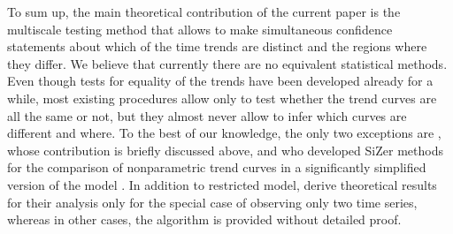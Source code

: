 \documentclass[a4paper,12pt]{article}
\makeatletter
\renewcommand{\eqref}[1]{\tagform@{\ref{#1}}}
\makeatother
\begin{document}


To sum up, the main theoretical contribution of the current paper is the multiscale testing method that allows to make simultaneous confidence statements about which of the time trends are distinct and the regions where they differ. We believe that currently there are no equivalent statistical methods. Even though tests for equality of the trends have been developed already for a while, most existing procedures allow only to test whether the trend curves are all the same or not, but they almost never allow to infer which curves are different and where. To the best of our knowledge, the only two exceptions are \cite{KhismatullinaVogt2021}, whose contribution is briefly discussed above, and \cite{Park2009} who developed SiZer methods for the comparison of nonparametric trend curves in a significantly simplified version of the model \eqref{eq:model}. In addition to restricted model, \cite{Park2009} derive theoretical results for their analysis only for the special case of observing only two time series, whereas in other cases, the algorithm is provided without detailed proof.
\end{document}
